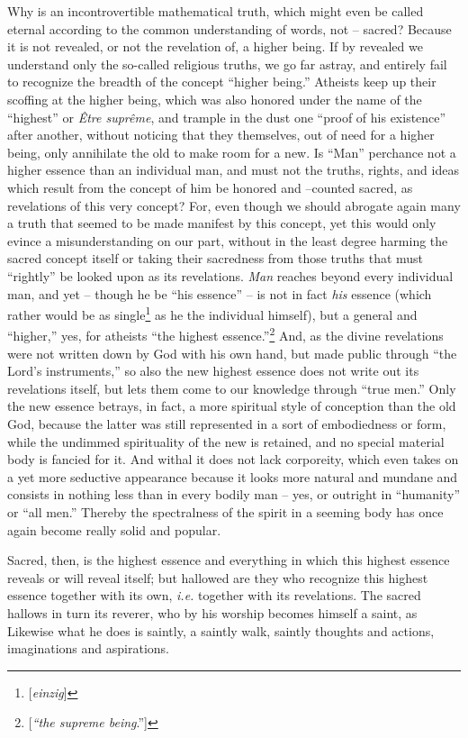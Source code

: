 \documentclass[12pt,a4paper]{book}
\begin{document}
Why is an incontrovertible mathematical truth, which might even be called 
eternal according to the common understanding of words, not -- sacred? Because 
it is not revealed, or not the revelation of, a higher being. If by revealed 
we understand only the so-called religious truths, we go far astray, and 
entirely fail to recognize the breadth of the concept ``higher being.'' 
Atheists keep up their scoffing at the higher being, which was also honored 
under the name of the ``highest'' or \textit{\^Etre supr\^eme}, and trample 
in the dust one ``proof of his existence'' after another, without noticing 
that they themselves, out of need for a higher being, only annihilate the old 
to make room for a new. Is ``Man'' perchance not a higher essence than an 
individual man, and must not the truths, rights, and ideas which result from 
the concept of him be honored and --counted sacred, as revelations of this 
very concept? For, even though we should abrogate again many a truth that 
seemed to be made manifest by this concept, yet this would only evince a 
misunderstanding on our part, without in the least degree harming the sacred 
concept itself or taking their sacredness from those truths that must 
``rightly'' be looked upon as its revelations. \textit{Man} reaches beyond 
every individual man, and yet -- though he be ``his essence'' -- is not in 
fact \textit{his} essence (which rather would be as 
single\footnote{[\textit{einzig}]} as he the individual himself), but a 
general and ``higher,'' yes, for atheists ``the highest 
essence.''\footnote{[\textit{``the supreme being}.'']} And, as the divine 
revelations were not written down by God with his own hand, but made public 
through ``the Lord's instruments,'' so also the new highest essence does not 
write out its revelations itself, but lets them come to our knowledge through 
``true men.'' Only the new essence betrays, in fact, a more spiritual style 
of conception than the old God, because the latter was still represented in a 
sort of embodiedness or form, while the undimmed spirituality of the new is 
retained, and no special material body is fancied for it. And withal it does 
not lack corporeity, which even takes on a yet more seductive appearance 
because it looks more natural and mundane and consists in nothing less than in 
every bodily man -- yes, or outright in ``humanity'' or ``all men.'' 
Thereby the spectralness of the spirit in a seeming body has once again become 
really solid and popular.

Sacred, then, is the highest essence and everything in which this highest 
essence reveals or will reveal itself; but hallowed are they who recognize 
this highest essence together with its own, \textit{i.e.} together with its 
revelations. The sacred hallows in turn its reverer, who by his worship 
becomes himself a saint, as Likewise what he does is saintly, a saintly walk, 
saintly thoughts and actions, imaginations and aspirations.
\end{document}
